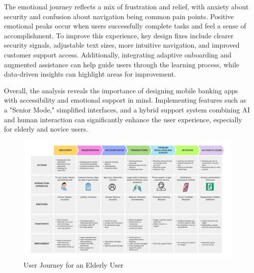 \documentclass[a4paper,12pt]{report}
\begin{document}
The emotional journey reflects a mix of frustration and relief, with anxiety about security and confusion about navigation being common pain points. Positive emotional peaks occur when users successfully complete tasks and feel a sense of accomplishment. To improve this experience, key design fixes include clearer security signals, adjustable text sizes, more intuitive navigation, and improved customer support access. Additionally, integrating adaptive onboarding and augmented assistance can help guide users through the learning process, while data-driven insights can highlight areas for improvement.

Overall, the analysis reveals the importance of designing mobile banking apps with accessibility and emotional support in mind. Implementing features such as a "Senior Mode," simplified interfaces, and a hybrid support system combining AI and human interaction can significantly enhance the user experience, especially for elderly and novice users.

\begin{figure}[h]
  \centering
  \includegraphics[width=\linewidth]{../images/infographics/user_journey.png}
  \caption{User Journey for an Elderly User}
\end{figure}
\end{document}
